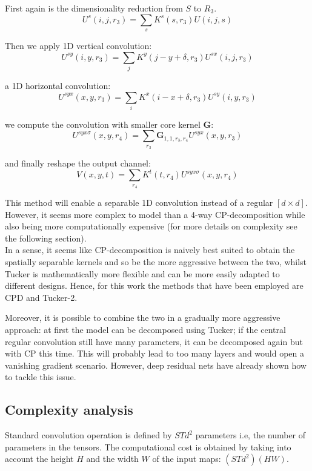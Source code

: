 First again is the dimensionality reduction from $S$ to $R_3$. 
\begin{equation}
    U^s(i,j,r_3) = \sum_s K^s(s, r_3) U(i,j,s)
\end{equation}

Then we apply 1D vertical convolution: 
\begin{equation}
        U^{sy}(i,y,r_3) = \sum_j K^y(j-y+\delta, r_3) U^{sx}(i,j,r_3)
\end{equation}

a 1D horizontal convolution: 
\begin{equation}
    U^{syx}(x,y,r_3) = \sum_i K^x(i-x+\delta, r_3) U^{sy}(i,y,r_3)
\end{equation}

we compute the convolution with smaller core kernel $\mathbf{G}$:
\begin{equation}
U^{syx\sigma}(x,y,r_4) = \sum_{r_3} \mathbf{G}_{1,1,r_3,r_4} U^{syx}(x,y,r_3)
\end{equation}

and finally reshape the output channel:
\begin{equation}
    V(x, y,t) = \sum_{r_4} K^t(t, r_4)U^{syx\sigma}(x,y,r_4)
\end{equation}

This method will enable a separable 1D convolution instead of a regular $[d \times d]$. However, it seems more complex to model than a 4-way CP-decomposition while also being more computationally expensive (for more details on complexity see the following section). \\
In a sense, it seems like CP-decomposition is naively best suited to obtain the spatially separable kernels and so be the more aggressive between the two, whilst Tucker is mathematically more flexible and can be more easily adapted to different designs. Hence, for this work the methods that have been employed are CPD and Tucker-2. 

Moreover, it is possible to combine the two in a gradually more aggressive approach: at first the model can be decomposed using Tucker; if the central regular convolution still have many parameters, it can be decomposed again but with CP this time. This will probably lead to too many layers and would open a vanishing gradient scenario. However, deep residual nets\parencite{resnet} have already shown how to tackle this issue. 


\pagebreak
\subsection{Complexity analysis}
\label{subsec:complexity}
Standard convolution operation is defined by $STd^2$ parameters i.e, the number of parameters in the tensors. The computational cost is obtained by taking into account the height $H$ and the width $W$ of the input maps: $(STd^2)(HW)$. 


